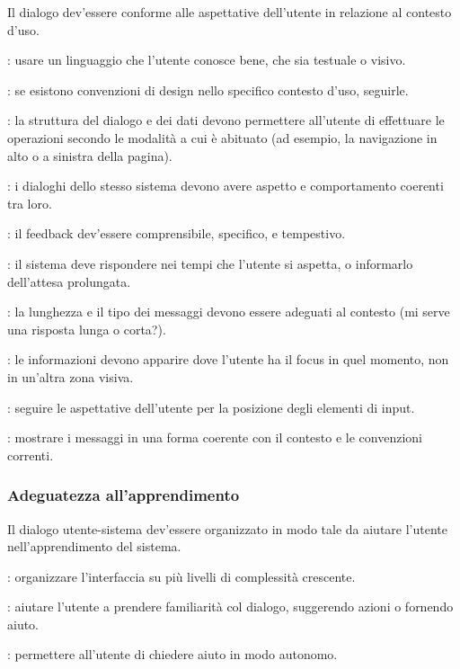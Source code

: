 Il dialogo dev'essere conforme alle aspettative dell'utente in relazione al contesto d'uso.

: usare un linguaggio che l'utente conosce bene, che sia testuale o visivo.

: se esistono convenzioni di design nello specifico contesto d'uso, seguirle.

: la struttura del dialogo e dei dati devono permettere all'utente di effettuare le operazioni secondo le modalità a cui è abituato (ad esempio, la navigazione in alto o a sinistra della pagina).

: i dialoghi dello stesso sistema devono avere aspetto e comportamento coerenti tra loro.

: il feedback dev'essere comprensibile, specifico, e tempestivo.

: il sistema deve rispondere nei tempi che l'utente si aspetta, o informarlo dell'attesa prolungata.

: la lunghezza e il tipo dei messaggi devono essere adeguati al contesto (mi serve una risposta lunga o corta?).

: le informazioni devono apparire dove l'utente ha il focus in quel momento, non in un'altra zona visiva.

: seguire le aspettative dell'utente per la posizione degli elementi di input.

: mostrare i messaggi in una forma coerente con il contesto e le convenzioni correnti.

\subsubsection{Adeguatezza all'apprendimento}

Il dialogo utente-sistema dev'essere organizzato in modo tale da aiutare l'utente nell'apprendimento del sistema.

: organizzare l'interfaccia su più livelli di complessità crescente.

: aiutare l'utente a prendere familiarità col dialogo, suggerendo azioni o fornendo aiuto.

: permettere all'utente di chiedere aiuto in modo autonomo.


